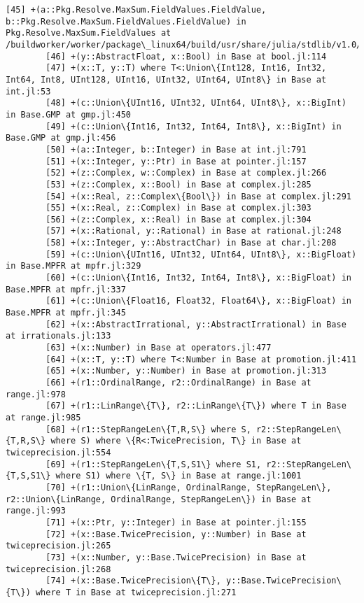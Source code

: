 \documentclass[11pt]{article}
\begin{document}
\begin{Verbatim}[commandchars=\\\{\}]
        [45] +(a::Pkg.Resolve.MaxSum.FieldValues.FieldValue, b::Pkg.Resolve.MaxSum.FieldValues.FieldValue) in Pkg.Resolve.MaxSum.FieldValues at /buildworker/worker/package\_linux64/build/usr/share/julia/stdlib/v1.0/Pkg/src/resolve/FieldValues.jl:49
        [46] +(y::AbstractFloat, x::Bool) in Base at bool.jl:114
        [47] +(x::T, y::T) where T<:Union\{Int128, Int16, Int32, Int64, Int8, UInt128, UInt16, UInt32, UInt64, UInt8\} in Base at int.jl:53
        [48] +(c::Union\{UInt16, UInt32, UInt64, UInt8\}, x::BigInt) in Base.GMP at gmp.jl:450
        [49] +(c::Union\{Int16, Int32, Int64, Int8\}, x::BigInt) in Base.GMP at gmp.jl:456
        [50] +(a::Integer, b::Integer) in Base at int.jl:791
        [51] +(x::Integer, y::Ptr) in Base at pointer.jl:157
        [52] +(z::Complex, w::Complex) in Base at complex.jl:266
        [53] +(z::Complex, x::Bool) in Base at complex.jl:285
        [54] +(x::Real, z::Complex\{Bool\}) in Base at complex.jl:291
        [55] +(x::Real, z::Complex) in Base at complex.jl:303
        [56] +(z::Complex, x::Real) in Base at complex.jl:304
        [57] +(x::Rational, y::Rational) in Base at rational.jl:248
        [58] +(x::Integer, y::AbstractChar) in Base at char.jl:208
        [59] +(c::Union\{UInt16, UInt32, UInt64, UInt8\}, x::BigFloat) in Base.MPFR at mpfr.jl:329
        [60] +(c::Union\{Int16, Int32, Int64, Int8\}, x::BigFloat) in Base.MPFR at mpfr.jl:337
        [61] +(c::Union\{Float16, Float32, Float64\}, x::BigFloat) in Base.MPFR at mpfr.jl:345
        [62] +(x::AbstractIrrational, y::AbstractIrrational) in Base at irrationals.jl:133
        [63] +(x::Number) in Base at operators.jl:477
        [64] +(x::T, y::T) where T<:Number in Base at promotion.jl:411
        [65] +(x::Number, y::Number) in Base at promotion.jl:313
        [66] +(r1::OrdinalRange, r2::OrdinalRange) in Base at range.jl:978
        [67] +(r1::LinRange\{T\}, r2::LinRange\{T\}) where T in Base at range.jl:985
        [68] +(r1::StepRangeLen\{T,R,S\} where S, r2::StepRangeLen\{T,R,S\} where S) where \{R<:TwicePrecision, T\} in Base at twiceprecision.jl:554
        [69] +(r1::StepRangeLen\{T,S,S1\} where S1, r2::StepRangeLen\{T,S,S1\} where S1) where \{T, S\} in Base at range.jl:1001
        [70] +(r1::Union\{LinRange, OrdinalRange, StepRangeLen\}, r2::Union\{LinRange, OrdinalRange, StepRangeLen\}) in Base at range.jl:993
        [71] +(x::Ptr, y::Integer) in Base at pointer.jl:155
        [72] +(x::Base.TwicePrecision, y::Number) in Base at twiceprecision.jl:265
        [73] +(x::Number, y::Base.TwicePrecision) in Base at twiceprecision.jl:268
        [74] +(x::Base.TwicePrecision\{T\}, y::Base.TwicePrecision\{T\}) where T in Base at twiceprecision.jl:271

\end{Verbatim}
\end{document}
